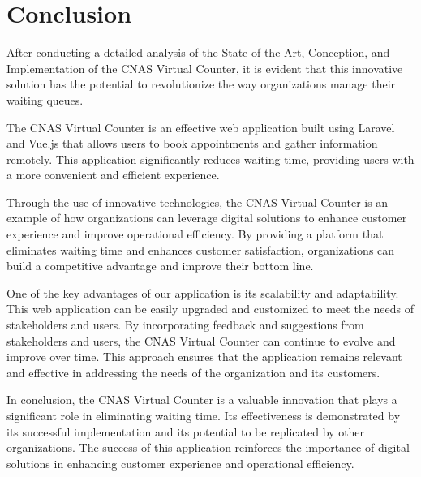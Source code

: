 \chapter*{Conclusion}
After conducting a detailed analysis of the State of the Art, Conception, and Implementation of the CNAS Virtual Counter, it is evident that this innovative solution has the potential to revolutionize the way organizations manage their waiting queues.

The CNAS Virtual Counter is an effective web application built using Laravel and Vue.js that allows users to book appointments and gather information remotely. This application significantly reduces waiting time, providing users with a more convenient and efficient experience.

Through the use of innovative technologies, the CNAS Virtual Counter is an example of how organizations can leverage digital solutions to enhance customer experience and improve operational efficiency. By providing a platform that eliminates waiting time and enhances customer satisfaction, organizations can build a competitive advantage and improve their bottom line.

One of the key advantages of our application is its scalability and adaptability. This web application can be easily upgraded and customized to meet the needs of stakeholders and users. By incorporating feedback and suggestions from stakeholders and users, the CNAS Virtual Counter can continue to evolve and improve over time. This approach ensures that the application remains relevant and effective in addressing the needs of the organization and its customers.


In conclusion, the CNAS Virtual Counter is a valuable innovation that plays a significant role in eliminating waiting time. Its effectiveness is demonstrated by its successful implementation and its potential to be replicated by other organizations. The success of this application reinforces the importance of digital solutions in enhancing customer experience and operational efficiency.